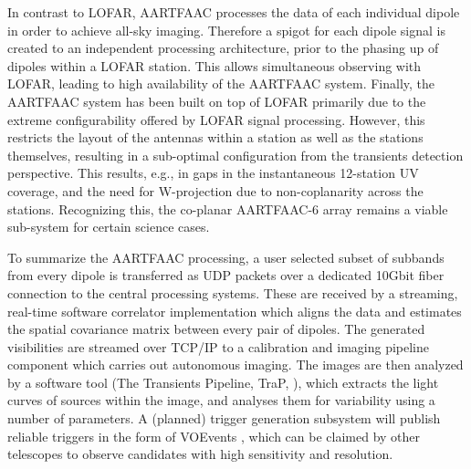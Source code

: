\documentclass{ws-jai}
\begin{document}
In contrast to  LOFAR, AARTFAAC processes the data of  each individual dipole in
order to achieve  all-sky imaging. Therefore a spigot for  each dipole signal is
created to  an independent processing architecture,  prior to the phasing  up of
dipoles within a LOFAR station.   This allows simultaneous observing with LOFAR,
leading  to high  availability of  the  AARTFAAC system.  Finally, the  AARTFAAC
system  has  been   built  on  top  of  LOFAR  primarily   due  to  the  extreme
configurability offered by LOFAR signal processing.  However, this restricts the
layout of  the antennas  within a  station as well  as the  stations themselves,
resulting  in   a  sub-optimal  configuration  from   the  transients  detection
perspective.  This results,  e.g., in  gaps in  the instantaneous  12-station UV
coverage,  and the  need  for  W-projection due  to  non-coplanarity across  the
stations.  Recognizing  this, the  co-planar AARTFAAC-6  array remains  a viable
sub-system for certain science cases.


To summarize  the AARTFAAC processing, a  user selected subset of  subbands from
every  dipole is  transferred  as  UDP packets  over  a  dedicated 10Gbit  fiber
connection  to  the  central  processing  systems.   These  are  received  by  a
streaming, real-time  software correlator  implementation which aligns  the data
and estimates the spatial covariance matrix  between every pair of dipoles.  The
generated visibilities  are streamed  over TCP/IP to  a calibration  and imaging
pipeline component  which carries out  autonomous imaging.  The images  are then
analyzed    by   a    software    tool   (The    Transients   Pipeline,    TraP,
\citep{swinbank2015lofar}), which  extracts the  light curves of  sources within
the image,  and analyses them for  variability using a number  of parameters.  A
(planned) trigger  generation subsystem  will publish  reliable triggers  in the
form  of VOEvents  \cite{williams2006voevent},  which can  be  claimed by  other
telescopes to observe candidates with high sensitivity and resolution.
\end{document}

